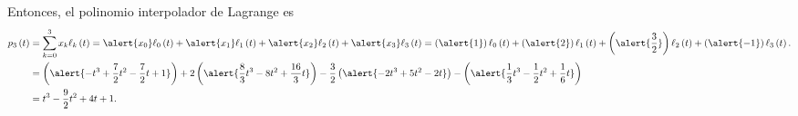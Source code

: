 \begin{frame}
	\begin{solution}
		Entonces, el polinomio interpolador de Lagrange es
		\begin{align*}
			p_{3}\left(t\right) & =
			\sum\limits_{k=0}^{3}
			x_{k}
			\ell_{k}\left(t\right)=
			\alert{x_{0}}
			\ell_{0}\left(t\right)+
			\alert{x_{1}}
			\ell_{1}\left(t\right)+
			\alert{x_{2}}
			\ell_{2}\left(t\right)+
			\alert{x_{3}}
			\ell_{3}\left(t\right)=
			\left(
			\alert{1}
			\right)
			\ell_{0}
			\left(t\right)+
			\left(
			\alert{2}
			\right)
			\ell_{1}\left(t\right)+
			\left(
			\alert{\dfrac{3}{2}}
			\right)
			\ell_{2}\left(t\right)+
			\left(
			\alert{-1}
			\right)
			\ell_{3}\left(t\right). \\
			                    & =
			\left(
			\alert{
				-t^{3}+\dfrac{7}{2}t^{2}-\dfrac{7}{2}t+1
			}
			\right)+
			2
			\left(
			\alert{
				\dfrac{8}{3}t^{3}-8t^{2}+\dfrac{16}{3}t
			}
			\right)-
			\dfrac{3}{2}
			\left(
			\alert{
				-2t^{3}+5t^{2}-2t
			}
			\right)-
			\left(
			\alert{
				\dfrac{1}{3}t^{3}-\dfrac{1}{2}t^{2}+\dfrac{1}{6}t
			}
			\right)                 \\
			                    & =
			t^{3}-\dfrac{9}{2}t^{2}+4t+1.
		\end{align*}
	\end{solution}
\end{frame}



